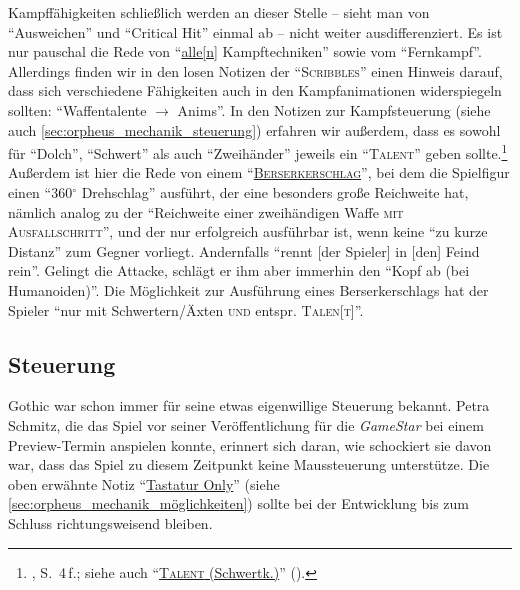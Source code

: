 \documentclass[a5paper,pagesize,numbers=noenddot]{scrbook}
\begin{document}
Kampffähigkeiten schließlich werden an dieser Stelle -- sieht man von \enquote{Ausweichen}\autocite[S.~5]{orpheus_gildensystem} und \enquote{Critical Hit}\autocite[S.~1]{orpheus_gildensystem} einmal ab -- nicht weiter ausdifferenziert.
Es ist nur pauschal die Rede von \enquote{\uline{alle[n]} Kampftechniken}\autocite[S.~8]{orpheus_gildensystem} sowie vom \enquote{Fernkampf}.\autocite[S.~13, 15]{orpheus_gildensystem}
Allerdings finden wir in den losen Notizen der \enquote{\textsc{Scribbles}} einen Hinweis darauf, dass sich verschiedene Fähigkeiten auch in den Kampfanimationen widerspiegeln sollten:
\enquote{Waffentalente $\rightarrow$ Anims}.\autocite[S.~7]{orpheus_b_scribbles}
In den Notizen zur Kampfsteuerung (siehe auch \autoref{sec:orpheus_mechanik_steuerung}) erfahren wir außerdem, dass es sowohl für \enquote{Dolch}, \enquote{Schwert} als auch \enquote{Zweihänder} jeweils ein \enquote{\textsc{Talent}} geben sollte.\footnote{\autocite{orpheus_kampfsteuerung}, S.~4\,f.; siehe auch \enquote{\uline{\textsc{Talent} (Schwertk.)}} (\autocite[S.~1]{orpheus_kampfsteuerung}).}
Außerdem ist hier die Rede von einem \enquote{\textsc{\uline{Berserkerschlag}}}, bei dem die Spielfigur einen \enquote{360$^{\circ}$ Drehschlag} ausführt,\autocite[S.~1]{orpheus_kampfsteuerung} der eine besonders große Reichweite hat, nämlich analog zu der \enquote{Reichweite einer zweihändigen Waffe \textsc{mit Ausfallschritt}}, und der nur erfolgreich ausführbar ist, wenn keine \enquote{zu kurze Distanz} zum Gegner vorliegt.
Andernfalls \enquote{rennt [der Spieler] in [den] Feind rein}.
Gelingt die Attacke, schlägt er ihm aber immerhin den \enquote{Kopf ab (bei Humanoiden)}.
Die Möglichkeit zur Ausführung eines Berserkerschlags hat der Spieler \enquote{nur mit Schwertern/Äxten \textsc{und} entspr. \textsc{Talen[t]}}.\autocite[S.~3]{orpheus_kampfsteuerung}


\subsection{Steuerung}\label{sec:orpheus_mechanik_steuerung}
Gothic war schon immer für seine etwas eigenwillige Steuerung bekannt.
Petra Schmitz, die das Spiel vor seiner Veröffentlichung für die \textit{GameStar} bei einem Preview-Termin anspielen konnte, erinnert sich daran, wie schockiert sie davon war, dass das Spiel zu diesem Zeitpunkt keine Maussteuerung unterstütze.\autocite{schmitz_maussteuerung_2021}
Die oben erwähnte Notiz \enquote{\uline{Tastatur Only}}\autocite[S.~1]{orpheus_interface} (siehe \autoref{sec:orpheus_mechanik_möglichkeiten}) sollte bei der Entwicklung bis zum Schluss richtungsweisend bleiben.
\end{document}
